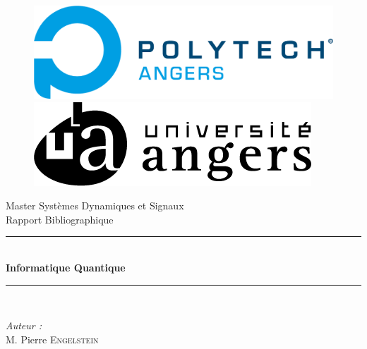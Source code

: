 \documentclass[12pt,a4paper]{report}
\begin{document}
\begin{titlepage}
    \begin{center}
      \begin{figure}[!tbp]
        \centering
        \begin{minipage}[b]{0.4\textwidth}
          \includegraphics[width=\textwidth]{Polytech_Angers.png}
        \end{minipage}
        \hfill
        \begin{minipage}[b]{0.4\textwidth}
          \includegraphics[width=\textwidth]{LogoUnivAngers.png}
        \end{minipage}
      \end{figure}
      {\large Master Systèmes Dynamiques et Signaux}\\[0.5cm]
      {\large Rapport Bibliographique}\\[0.5cm]
      \rule{\linewidth}{0.5mm} \\[0.4cm]
      { \huge \bfseries Informatique Quantique \\[0.4cm] }
      \rule{\linewidth}{0.5mm} \\[1.5cm]
      \noindent
      \begin{minipage}{0.4\textwidth}
        \begin{flushleft} \large
          \emph{Auteur :}\\
          M. Pierre \textsc{Engelstein}\\
          \end{flushleft}
          \end{minipage}%
          \begin{minipage}{0.4\textwidth}
          \begin{flushright} \large

\end{flushright}
\end{minipage}
\end{center}
\end{titlepage}
\end{document}
